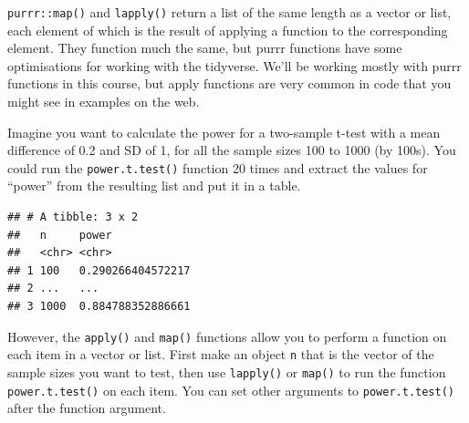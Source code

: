 \documentclass[
  oneside]{book}
\newenvironment{Shaded}{\begin{snugshade}}{\end{snugshade}}
\newcommand{\AttributeTok}[1]{\textcolor[rgb]{0.77,0.63,0.00}{#1}}
\newcommand{\CommentTok}[1]{\textcolor[rgb]{0.56,0.35,0.01}{\textit{#1}}}
\newcommand{\DecValTok}[1]{\textcolor[rgb]{0.00,0.00,0.81}{#1}}
\newcommand{\FloatTok}[1]{\textcolor[rgb]{0.00,0.00,0.81}{#1}}
\newcommand{\FunctionTok}[1]{\textcolor[rgb]{0.00,0.00,0.00}{#1}}
\newcommand{\NormalTok}[1]{#1}
\newcommand{\OtherTok}[1]{\textcolor[rgb]{0.56,0.35,0.01}{#1}}
\newcommand{\SpecialCharTok}[1]{\textcolor[rgb]{0.00,0.00,0.00}{#1}}
\newcommand{\StringTok}[1]{\textcolor[rgb]{0.31,0.60,0.02}{#1}}
\begin{document}
\texttt{purrr::map()} and \texttt{lapply()} return a list of the same length as a vector or list, each element of which is the result of applying a function to the corresponding element. They function much the same, but purrr functions have some optimisations for working with the tidyverse. We'll be working mostly with purrr functions in this course, but apply functions are very common in code that you might see in examples on the web.

Imagine you want to calculate the power for a two-sample t-test with a mean difference of 0.2 and SD of 1, for all the sample sizes 100 to 1000 (by 100s). You could run the \texttt{power.t.test()} function 20 times and extract the values for ``power'' from the resulting list and put it in a table.

\begin{Shaded}
\end{Shaded}

\begin{verbatim}
## # A tibble: 3 x 2
##   n     power            
##   <chr> <chr>            
## 1 100   0.290266404572217
## 2 ...   ...              
## 3 1000  0.884788352886661
\end{verbatim}

However, the \texttt{apply()} and \texttt{map()} functions allow you to perform a function on each item in a vector or list. First make an object \texttt{n} that is the vector of the sample sizes you want to test, then use \texttt{lapply()} or \texttt{map()} to run the function \texttt{power.t.test()} on each item. You can set other arguments to \texttt{power.t.test()} after the function argument.
\end{document}

